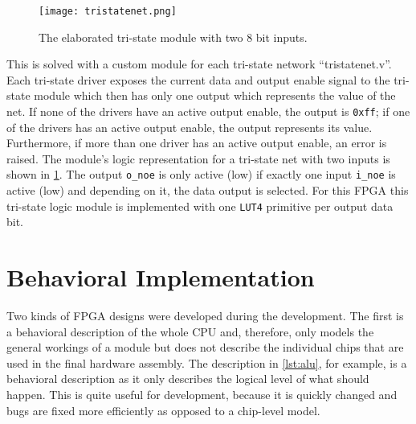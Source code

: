 \begin{figure}[t]
  \centering
  \texttt{[image: tristatenet.png]}
  \caption{The elaborated tri-state module with two 8 bit inputs.}
  \label{fig:tristatenet}
\end{figure}
This is solved with a custom module for each tri-state network ``tristatenet.v''.
Each tri-state driver exposes the current data and output enable signal to the tri-state module which then has only one output which represents the value of the net.
If none of the drivers have an active output enable, the output is \texttt{0xff}; if one of the drivers has an active output enable, the output represents its value.
Furthermore, if more than one driver has an active output enable, an error is raised.
The module's logic representation for a tri-state net with two inputs is shown in \cref{fig:tristatenet}.
The output \texttt{o\_noe} is only active (low) if exactly one input \texttt{i\_noe} is active (low) and depending on it, the data output is selected.
For this \gls{FPGA} this tri-state logic module is implemented with one \texttt{LUT4} primitive per output data bit.

\section{Behavioral Implementation}
Two kinds of \gls{FPGA} designs were developed during the development.
The first is a behavioral description of the whole \gls{CPU} and, therefore, only models the general workings of a module but does not describe the individual chips that are used in the final hardware assembly.
The description in \cref{lst:alu}, for example, is a behavioral description as it only describes the logical level of what should happen.
This is quite useful for development, because it is quickly changed and bugs are fixed more efficiently as opposed to a chip-level model.

